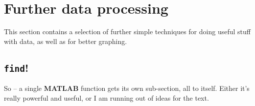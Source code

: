 \documentclass{tufte-book} %
\begin{document}

\newpage


\section{Further data processing}

This section contains a selection of further simple techniques for doing useful stuff with data, as well as for better graphing.


\newpage


\subsection{\texttt{find}!}

So -- a single \textbf{MATLAB} function gets its own sub-section, all to itself. Either it's really powerful and useful, or I am running out of ideas for the text.
\end{document}
